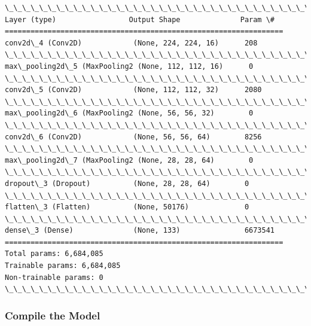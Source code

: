 \documentclass[11pt]{article}
\begin{document}
    \begin{Verbatim}[commandchars=\\\{\}]
\_\_\_\_\_\_\_\_\_\_\_\_\_\_\_\_\_\_\_\_\_\_\_\_\_\_\_\_\_\_\_\_\_\_\_\_\_\_\_\_\_\_\_\_\_\_\_\_\_\_\_\_\_\_\_\_\_\_\_\_\_\_\_\_\_
Layer (type)                 Output Shape              Param \#   
=================================================================
conv2d\_4 (Conv2D)            (None, 224, 224, 16)      208       
\_\_\_\_\_\_\_\_\_\_\_\_\_\_\_\_\_\_\_\_\_\_\_\_\_\_\_\_\_\_\_\_\_\_\_\_\_\_\_\_\_\_\_\_\_\_\_\_\_\_\_\_\_\_\_\_\_\_\_\_\_\_\_\_\_
max\_pooling2d\_5 (MaxPooling2 (None, 112, 112, 16)      0         
\_\_\_\_\_\_\_\_\_\_\_\_\_\_\_\_\_\_\_\_\_\_\_\_\_\_\_\_\_\_\_\_\_\_\_\_\_\_\_\_\_\_\_\_\_\_\_\_\_\_\_\_\_\_\_\_\_\_\_\_\_\_\_\_\_
conv2d\_5 (Conv2D)            (None, 112, 112, 32)      2080      
\_\_\_\_\_\_\_\_\_\_\_\_\_\_\_\_\_\_\_\_\_\_\_\_\_\_\_\_\_\_\_\_\_\_\_\_\_\_\_\_\_\_\_\_\_\_\_\_\_\_\_\_\_\_\_\_\_\_\_\_\_\_\_\_\_
max\_pooling2d\_6 (MaxPooling2 (None, 56, 56, 32)        0         
\_\_\_\_\_\_\_\_\_\_\_\_\_\_\_\_\_\_\_\_\_\_\_\_\_\_\_\_\_\_\_\_\_\_\_\_\_\_\_\_\_\_\_\_\_\_\_\_\_\_\_\_\_\_\_\_\_\_\_\_\_\_\_\_\_
conv2d\_6 (Conv2D)            (None, 56, 56, 64)        8256      
\_\_\_\_\_\_\_\_\_\_\_\_\_\_\_\_\_\_\_\_\_\_\_\_\_\_\_\_\_\_\_\_\_\_\_\_\_\_\_\_\_\_\_\_\_\_\_\_\_\_\_\_\_\_\_\_\_\_\_\_\_\_\_\_\_
max\_pooling2d\_7 (MaxPooling2 (None, 28, 28, 64)        0         
\_\_\_\_\_\_\_\_\_\_\_\_\_\_\_\_\_\_\_\_\_\_\_\_\_\_\_\_\_\_\_\_\_\_\_\_\_\_\_\_\_\_\_\_\_\_\_\_\_\_\_\_\_\_\_\_\_\_\_\_\_\_\_\_\_
dropout\_3 (Dropout)          (None, 28, 28, 64)        0         
\_\_\_\_\_\_\_\_\_\_\_\_\_\_\_\_\_\_\_\_\_\_\_\_\_\_\_\_\_\_\_\_\_\_\_\_\_\_\_\_\_\_\_\_\_\_\_\_\_\_\_\_\_\_\_\_\_\_\_\_\_\_\_\_\_
flatten\_3 (Flatten)          (None, 50176)             0         
\_\_\_\_\_\_\_\_\_\_\_\_\_\_\_\_\_\_\_\_\_\_\_\_\_\_\_\_\_\_\_\_\_\_\_\_\_\_\_\_\_\_\_\_\_\_\_\_\_\_\_\_\_\_\_\_\_\_\_\_\_\_\_\_\_
dense\_3 (Dense)              (None, 133)               6673541   
=================================================================
Total params: 6,684,085
Trainable params: 6,684,085
Non-trainable params: 0
\_\_\_\_\_\_\_\_\_\_\_\_\_\_\_\_\_\_\_\_\_\_\_\_\_\_\_\_\_\_\_\_\_\_\_\_\_\_\_\_\_\_\_\_\_\_\_\_\_\_\_\_\_\_\_\_\_\_\_\_\_\_\_\_\_

    \end{Verbatim}

    \subsubsection{Compile the Model}\label{compile-the-model}
\end{document}
